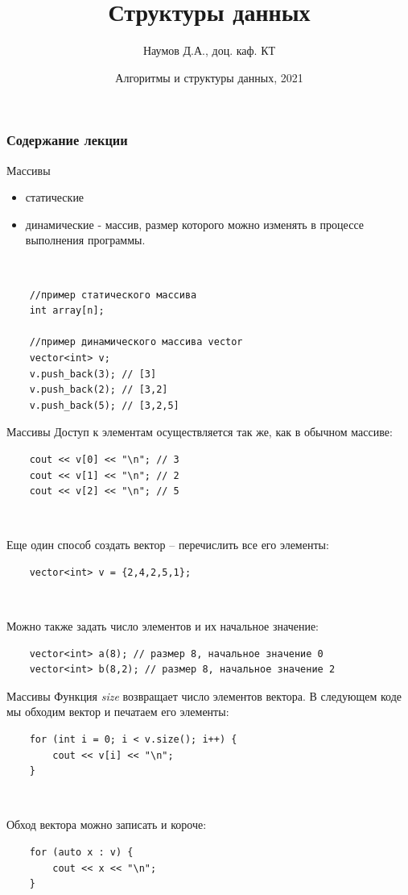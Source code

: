 \documentclass{beamer}
\title[C++]{Структуры данных}
\author{Наумов Д.А., доц. каф. КТ}
\date[11.10.2021] {Алгоритмы и структуры данных, 2021}
\begin{document}
\begin{frame}
  \titlepage
\end{frame}
  
\begin{frame}
  \frametitle{Содержание лекции}
  \tableofcontents  
\end{frame}

\begin{frame}[fragile]{Массивы}
	\begin{itemize}
		\item статические
		\item динамические - массив, размер которого можно изменять в
процессе выполнения программы. 		
	\end{itemize}
	
~
	
\begin{verbatim}
    //пример статического массива
    int array[n];
    
    //пример динамического массива vector
    vector<int> v;
    v.push_back(3); // [3]
    v.push_back(2); // [3,2]
    v.push_back(5); // [3,2,5]    
\end{verbatim}
\end{frame}

\begin{frame}[fragile]{Массивы}
	Доступ к элементам осуществляется так же, как в обычном массиве:
	\begin{verbatim}
    cout << v[0] << "\n"; // 3
    cout << v[1] << "\n"; // 2
    cout << v[2] << "\n"; // 5
	\end{verbatim}
	
	~
	
	Еще один способ создать вектор – перечислить все его элементы:
	\begin{verbatim}
    vector<int> v = {2,4,2,5,1};	
	\end{verbatim}	

    ~
    
	Можно также задать число элементов и их начальное значение:
	\begin{verbatim}
    vector<int> a(8); // размер 8, начальное значение 0
    vector<int> b(8,2); // размер 8, начальное значение 2
	\end{verbatim}
\end{frame}

\begin{frame}[fragile]{Массивы}
    Функция \textit{size} возвращает число элементов вектора. В следующем коде мы обходим вектор и печатаем его элементы:

	\begin{verbatim}
    for (int i = 0; i < v.size(); i++) {
        cout << v[i] << "\n";
    }
	\end{verbatim}
	
	~
	
	Обход вектора можно записать и короче:
	\begin{verbatim}
    for (auto x : v) {
        cout << x << "\n";
    }
	\end{verbatim}
\end{frame}
\end{document}
